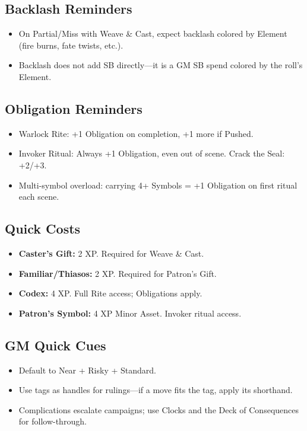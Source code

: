 \subsection{Backlash Reminders}
\begin{itemize}
  \item On Partial/Miss with Weave \& Cast, expect backlash colored by Element (fire burns, fate twists, etc.).
  \item Backlash does not add SB directly—it is a GM SB spend colored by the roll’s Element.
\end{itemize}

\subsection{Obligation Reminders}
\begin{itemize}
  \item Warlock Rite: +1 Obligation on completion, +1 more if Pushed.
  \item Invoker Ritual: Always +1 Obligation, even out of scene. Crack the Seal: +2/+3.
  \item Multi-symbol overload: carrying 4+ Symbols = +1 Obligation on first ritual each scene.
\end{itemize}

\subsection{Quick Costs}
\begin{itemize}
  \item \textbf{Caster’s Gift:} 2 XP. Required for Weave \& Cast.
  \item \textbf{Familiar/Thiasos:} 2 XP. Required for Patron’s Gift.
  \item \textbf{Codex:} 4 XP. Full Rite access; Obligations apply.
  \item \textbf{Patron’s Symbol:} 4 XP Minor Asset. Invoker ritual access.
\end{itemize}

\subsection{GM Quick Cues}
\begin{itemize}
  \item Default to Near + Risky + Standard.
  \item Use tags as handles for rulings—if a move fits the tag, apply its shorthand.
  \item Complications escalate campaigns; use Clocks and the Deck of Consequences for follow-through.
\end{itemize}
